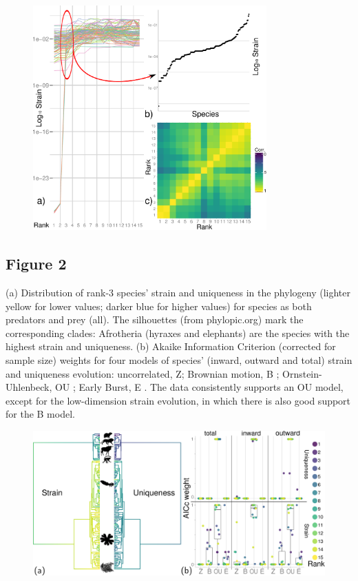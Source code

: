 \documentclass[12pt]{article}
\begin{document}
\begin{figure}[h!]
 \centering
 \includegraphics[width=0.8\textwidth]{./Images/Figure_1.pdf}
\end{figure}
\newpage

\subsection*{Figure 2}
(a) Distribution of rank-$3$ species' strain and uniqueness in the phylogeny
(lighter yellow for lower values; darker blue for higher values) for species as both
predators and prey (all). The silhouettes (from phylopic.org) mark the corresponding clades:
Afrotheria (hyraxes and elephants) are the species with the highest strain and uniqueness.
(b) Akaike Information Criterion (corrected for sample size) weights for four models of species'
(inward, outward and total) strain and uniqueness evolution:
uncorrelated, Z; Brownian motion, B \citep{felsenstein1985phylogenies};
Ornstein-Uhlenbeck, OU \citep{hansen1997stabilizing}; Early Burst, E
\citep{harmon2010early}. The data consistently supports an OU model, except
for the low-dimension strain evolution, in which there is also good support for the B model.

\begin{figure}[h!]
 \centering
 \includegraphics[width=\textwidth]{./Images/Figure_2.pdf}
\end{figure}
\newpage
\end{document}
